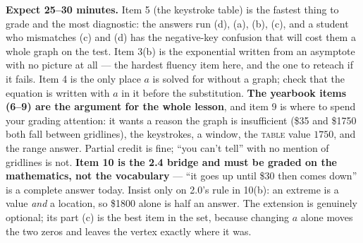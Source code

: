 \documentclass[10pt]{article}
\begin{document}
\boxguard[18]
\begin{teachernote}[Homework]
    \textbf{Expect 25--30 minutes.} Item 5 (the keystroke table) is the fastest thing to grade and the
    most diagnostic: the answers run (d), (a), (b), (c), and a student who mismatches (c) and (d) has
    the negative-key confusion that will cost them a whole graph on the test. Item 3(b) is the
    exponential written from an asymptote with no picture at all --- the hardest fluency item here,
    and the one to reteach if it fails. Item 4 is the only place $a$ is solved for without a graph;
    check that the equation is written with $a$ in it before the substitution. \textbf{The yearbook
    items (6--9) are the argument for the whole lesson}, and item 9 is where to spend your grading
    attention: it wants a reason the graph is insufficient (\$35 and \$1750 both fall between
    gridlines), the keystrokes, a window, the \textsc{table} value $1750$, and the range answer.
    Partial credit is fine; ``you can't tell'' with no mention of gridlines is not. \textbf{Item 10 is
    the 2.4 bridge and must be graded on the mathematics, not the vocabulary} --- ``it goes up until
    \$30 then comes down'' is a complete answer today. Insist only on 2.0's rule in 10(b): an extreme
    is a value \emph{and} a location, so \$1800 alone is half an answer. The extension is genuinely
    optional; its part (c) is the best item in the set, because changing $a$ alone moves the two zeros
    and leaves the vertex exactly where it was.
\end{teachernote}
\end{document}
